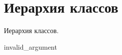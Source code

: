 \section{Иерархия классов}
Иерархия классов.\begin{DoxyCompactList}
\item {}
\item invalid\+\_\+argument\begin{DoxyCompactList}
\item {}
\end{DoxyCompactList}
\end{DoxyCompactList}

